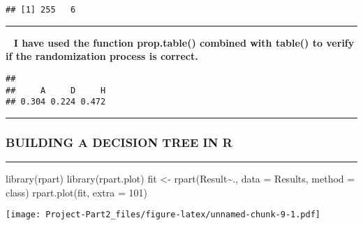 \documentclass[
]{article}
\newenvironment{Shaded}{\begin{snugshade}}{\end{snugshade}}
\newcommand{\AttributeTok}[1]{\textcolor[rgb]{0.77,0.63,0.00}{#1}}
\newcommand{\DecValTok}[1]{\textcolor[rgb]{0.00,0.00,0.81}{#1}}
\newcommand{\FunctionTok}[1]{\textcolor[rgb]{0.00,0.00,0.00}{#1}}
\newcommand{\NormalTok}[1]{#1}
\newcommand{\OtherTok}[1]{\textcolor[rgb]{0.56,0.35,0.01}{#1}}
\newcommand{\SpecialCharTok}[1]{\textcolor[rgb]{0.00,0.00,0.00}{#1}}
\newcommand{\StringTok}[1]{\textcolor[rgb]{0.31,0.60,0.02}{#1}}
\begin{document}
\begin{verbatim}
## [1] 255   6
\end{verbatim}

\begin{center}\rule{0.5\linewidth}{0.5pt}\end{center}

~ \textbf{I have used the function prop.table() combined with table() to
verify if the randomization process is correct.}

\begin{Shaded}
\end{Shaded}

\begin{verbatim}
## 
##     A     D     H 
## 0.304 0.224 0.472
\end{verbatim}

\begin{center}\rule{0.5\linewidth}{0.5pt}\end{center}

\hypertarget{building-a-decision-tree-in-r}{%
\subsubsection{\texorpdfstring{\textbf{BUILDING A DECISION TREE IN
R}}{BUILDING A DECISION TREE IN R}}\label{building-a-decision-tree-in-r}}

\begin{center}\rule{0.5\linewidth}{0.5pt}\end{center}

\begin{Shaded}
\begin{Highlighting}[]
\FunctionTok{library}\NormalTok{(rpart)}
\FunctionTok{library}\NormalTok{(rpart.plot)}
\NormalTok{fit }\OtherTok{\textless{}{-}} \FunctionTok{rpart}\NormalTok{(Result}\SpecialCharTok{\textasciitilde{}}\NormalTok{., }\AttributeTok{data =}\NormalTok{ Results, }\AttributeTok{method =} \StringTok{\textquotesingle{}class\textquotesingle{}}\NormalTok{)}
\FunctionTok{rpart.plot}\NormalTok{(fit, }\AttributeTok{extra =} \DecValTok{101}\NormalTok{)}
\end{Highlighting}
\end{Shaded}

\texttt{[image: Project-Part2\_files/figure-latex/unnamed-chunk-9-1.pdf]}
\end{document}
